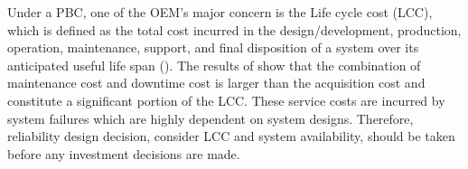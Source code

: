 \documentclass[preprint,12pt]{elsarticle}
\begin{document}



Under a PBC, one of the OEM's major concern is the Life cycle cost (LCC), which is defined as the total cost incurred in the design/development, production, operation, maintenance, support, and final disposition of a system over its anticipated useful life span (\citet{Barringer}). The results of \citet{Oner2007} show that the combination of maintenance cost and downtime cost is larger than the acquisition cost and constitute a significant portion of the LCC. These service costs are incurred by system failures which are highly dependent on system designs. Therefore, reliability design decision, consider LCC and system availability, should be taken before any investment decisions are made.
\end{document}
